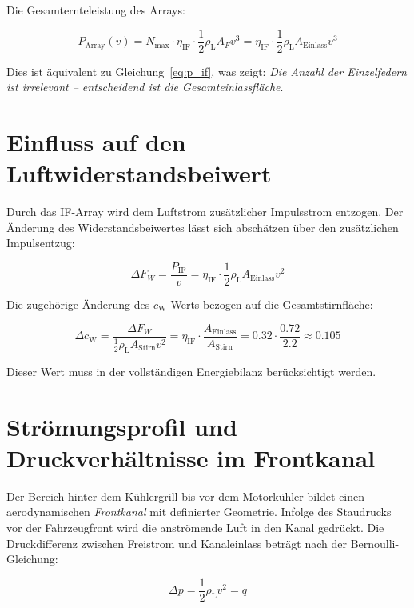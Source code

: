 ﻿\documentclass[12pt, a4paper]{report}
\theoremstyle{definition}
\theoremstyle{remark}
\newcommand{\rhoL}{\rho_{\text{L}}}
\newcommand{\cW}{c_{\text{W}}}
\newcommand{\Astirnfl}{A_{\text{Stirn}}}
\newcommand{\Aeinlass}{A_{\text{Einlass}}}
\begin{document}
Die Gesamternteleistung des Arrays:

\begin{equation}
  P_{\text{Array}}(v) = N_{\text{max}} \cdot \eta_{\text{IF}} \cdot \frac{1}{2}\rhoL A_F v^3
  = \eta_{\text{IF}} \cdot \frac{1}{2}\rhoL \Aeinlass v^3
  \label{eq:p_array}
\end{equation}

Dies ist äquivalent zu Gleichung~\eqref{eq:p_if}, was zeigt: \emph{Die Anzahl
der Einzelfedern ist irrelevant -- entscheidend ist die Gesamteinlassfläche}.

\section{Einfluss auf den Luftwiderstandsbeiwert}

Durch das IF-Array wird dem Luftstrom zusätzlicher Impulsstrom entzogen.
Der Änderung des Widerstandsbeiwertes lässt sich abschätzen über den
zusätzlichen Impulsentzug:

\begin{equation}
  \Delta F_W = \frac{P_{\text{IF}}}{v} = \eta_{\text{IF}} \cdot \frac{1}{2}\rhoL \Aeinlass v^2
  \label{eq:delta_fw}
\end{equation}

Die zugehörige Änderung des $\cW$-Werts bezogen auf die Gesamtstirnfläche:

\begin{equation}
  \Delta \cW = \frac{\Delta F_W}{\frac{1}{2}\rhoL \Astirnfl v^2}
  = \eta_{\text{IF}} \cdot \frac{\Aeinlass}{\Astirnfl}
  = 0.32 \cdot \frac{0.72}{2.2} \approx 0.105
  \label{eq:delta_cw}
\end{equation}

Dieser Wert muss in der vollständigen Energiebilanz berücksichtigt werden.

\section{Strömungsprofil und Druckverhältnisse im Frontkanal}
\label{sec:kfz_kanal}

Der Bereich hinter dem Kühlergrill bis vor dem Motorkühler bildet einen
aerodynamischen \emph{Frontkanal} mit definierter Geometrie. Infolge des
Staudrucks vor der Fahrzeugfront wird die anströmende Luft in den Kanal
gedrückt. Die Druckdifferenz zwischen Freistrom und Kanaleinlass beträgt
nach der Bernoulli-Gleichung:

\begin{equation}
  \Delta p = \frac{1}{2}\rhoL v^2 = q
  \label{eq:staudruck_kanal}
\end{equation}
\end{document}
